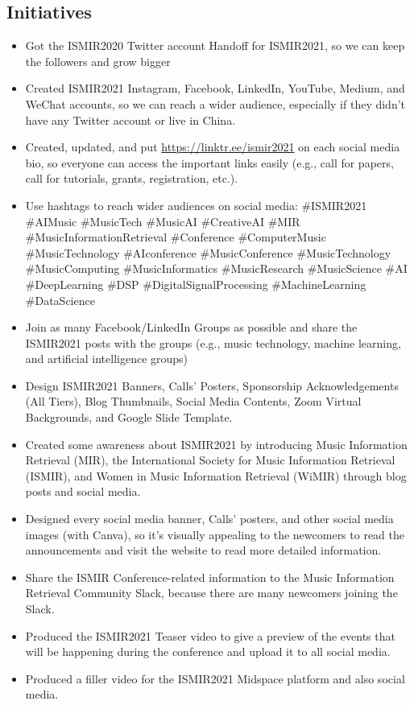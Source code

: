 \documentclass[%
10pt,								%
]
{scrartcl}
\begin{document}
    \subsection{Initiatives}
        \begin{itemize}
            \item   Got the ISMIR2020 Twitter account Handoff for ISMIR2021, so we can keep the followers and grow bigger
            \item   Created ISMIR2021 Instagram, Facebook, LinkedIn, YouTube, Medium, and WeChat accounts, so we can reach a wider audience, especially if they didn't have any Twitter account or live in China.
            \item   Created, updated, and put \href{https://linktr.ee/ismir2021}{https://linktr.ee/ismir2021} on each social media bio, so everyone can access the important links easily (e.g., call for papers, call for tutorials, grants, registration, etc.).
            \item   Use hashtags to reach wider audiences on social media: \#ISMIR2021 \#AIMusic \#MusicTech \#MusicAI \#CreativeAI \#MIR \#MusicInformationRetrieval \#Conference \#ComputerMusic \#MusicTechnology \#AIconference \#MusicConference \#MusicTechnology \#MusicComputing \#MusicInformatics \#MusicResearch \#MusicScience \#AI \#DeepLearning \#DSP \#DigitalSignalProcessing \#MachineLearning \#DataScience
            \item   Join as many Facebook/LinkedIn Groups as possible and share the ISMIR2021 posts with the groups (e.g., music technology, machine learning, and artificial intelligence groups)
            \item   Design ISMIR2021 Banners, Calls’ Posters, Sponsorship Acknowledgements (All Tiers), Blog Thumbnails, Social Media Contents, Zoom Virtual Backgrounds, and Google Slide Template.
            \item   Created some awareness about ISMIR2021 by introducing Music Information Retrieval (MIR), the International Society for Music Information Retrieval (ISMIR), and Women in Music Information Retrieval (WiMIR) through blog posts and social media.
            \item   Designed every social media banner, Calls’ posters, and other social media images (with Canva), so it’s visually appealing to the newcomers to read the announcements and visit the website to read more detailed information.
            \item   Share the ISMIR Conference-related information to the Music Information Retrieval Community Slack, because there are many newcomers joining the Slack.
            \item   Produced the ISMIR2021 Teaser video to give a preview of the events that will be happening during the conference and upload it to all social media.
            \item   Produced a filler video for the ISMIR2021 Midspace platform and also social media.
        \end{itemize}
        
\end{document}
